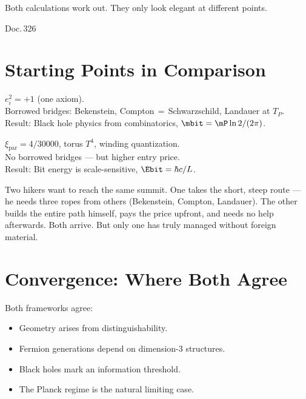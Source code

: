 \label{ch:vergleich_matzke_ffgft}

\epigraph{Both calculations work out.
They only look elegant at different points.}{Doc.\,326}

\section{Starting Points in Comparison}

\begin{matzbox}
 $e_i^2 = +1$ (one axiom).\\
Borrowed bridges: Bekenstein, Compton$\,{=}\,$Schwarzschild, Landauer at $T_P$.\\
Result: Black hole physics from combinatorics, $\mbit = \mP\ln 2/(2\pi)$.
\end{matzbox}

\begin{ffgftbox}[FFGFT]
 $\xi_{\text{par}} = 4/30000$, torus $T^4$, winding quantization.\\
No borrowed bridges --- but higher entry price.\\
Result: Bit energy is scale-sensitive, $\Ebit = \hbar c / L$. 
\end{ffgftbox}

\begin{laierspur}
Two hikers want to reach the same summit. One takes the short,
steep route --- he needs three ropes from others (Bekenstein, Compton, Landauer).
The other builds the entire path himself, pays the price upfront, and needs no help afterwards.
Both arrive. But only one has truly managed without foreign material.
\end{laierspur}

\section{Convergence: Where Both Agree}

Both frameworks agree: 
\begin{itemize}
  \item Geometry arises from distinguishability.
  \item Fermion generations depend on dimension-3 structures.
  \item Black holes mark an information threshold.
  \item The Planck regime is the natural limiting case.
\end{itemize}

